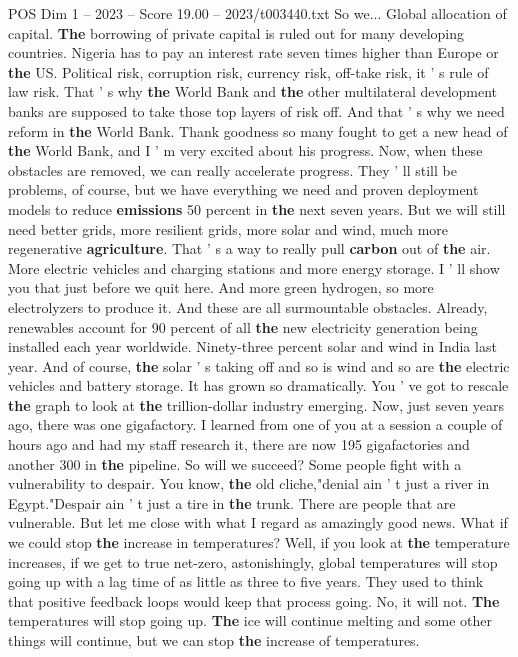 \begin{textsample}{POS Dim 1 – 2023 – Score 19.00 – 2023/t003440.txt}
So we...
Global allocation of capital. \textbf{The} borrowing of private capital is ruled out for many developing countries.
Nigeria has to pay an interest rate seven times higher than Europe or \textbf{the} US.
Political risk, corruption risk, currency risk, off-take risk, it ' s rule of law risk.
That ' s why \textbf{the} World Bank and \textbf{the} other multilateral development banks are supposed to take those top layers of risk off.
And that ' s why we need reform in \textbf{the} World Bank.
Thank goodness so many fought to get a new head of \textbf{the} World Bank, and I ' m very excited about his progress.
Now, when these obstacles are removed, we can really accelerate progress.
They ' ll still be problems, of course, but we have everything we need and proven deployment models to reduce \textbf{emissions} 50 percent in \textbf{the} next seven years.
But we will still need better grids, more resilient grids, more solar and wind, much more regenerative \textbf{agriculture}.
That ' s a way to really pull \textbf{carbon} out of \textbf{the} air.
More electric vehicles and charging stations and more energy storage.
I ' ll show you that just before we quit here.
And more green hydrogen, so more electrolyzers to produce it.
And these are all surmountable obstacles.
Already, renewables account for 90 percent of all \textbf{the} new electricity generation being installed each year worldwide.
Ninety-three percent solar and wind in India last year.
And of course, \textbf{the} solar ' s taking off and so is wind and so are \textbf{the} electric vehicles and battery storage.
It has grown so dramatically.
You ' ve got to rescale \textbf{the} graph to look at \textbf{the} trillion-dollar industry emerging.
Now, just seven years ago, there was one gigafactory.
I learned from one of you at a session a couple of hours ago and had my staff research it, there are now 195 gigafactories and another 300 in \textbf{the} pipeline.
So will we succeed?
Some people fight with a vulnerability to despair.
You know, \textbf{the} old cliche,"denial ain ' t just a river in Egypt."Despair ain ' t just a tire in \textbf{the} trunk.
There are people that are vulnerable.
But let me close with what I regard as amazingly good news.
What if we could stop \textbf{the} increase in temperatures?
Well, if you look at \textbf{the} temperature increases, if we get to true net-zero, astonishingly, global temperatures will stop going up with a lag time of as little as three to five years.
They used to think that positive feedback loops would keep that process going.
No, it will not. \textbf{The} temperatures will stop going up. \textbf{The} ice will continue melting and some other things will continue, but we can stop \textbf{the} increase of temperatures.

\end{textsample}
